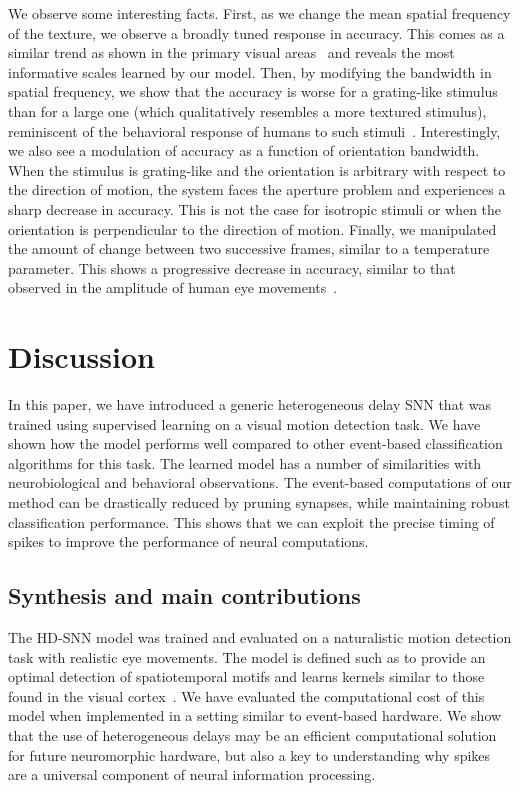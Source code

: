 \documentclass[default]{sn-jnl}%
\theoremstyle{thmstyleone}%
\theoremstyle{thmstyletwo}%
\theoremstyle{thmstylethree}%
\begin{document}
We observe some interesting facts. First, as we change the mean spatial frequency of the texture, we observe a broadly tuned response in accuracy. This comes as a similar trend as shown in the primary visual areas~\citep{priebe_tuning_2006,Perrinet2007} and reveals the most informative scales learned by our model. Then, by modifying the bandwidth in spatial frequency, we show that the accuracy is worse for a grating-like stimulus than for a large one (which qualitatively resembles a more textured stimulus), reminiscent of the behavioral response of humans to such stimuli~\citep{simoncini_more_2012, ravello_speed-selectivity_2019}. Interestingly, we also see a modulation of accuracy as a function of orientation bandwidth. When the stimulus is grating-like and the orientation is arbitrary with respect to the direction of motion, the system faces the aperture problem and experiences a sharp decrease in accuracy. This is not the case for isotropic stimuli or when the orientation is perpendicular to the direction of motion. Finally, we manipulated the amount of change between two successive frames, similar to a temperature parameter. This shows a progressive decrease in accuracy, similar to that observed in the amplitude of human eye movements~\citep{mansour_pour_speed_2018}.
%
\section{Discussion}
In this paper, we have introduced a generic heterogeneous delay SNN that was trained using supervised learning on a visual motion detection task. We have shown how the model performs well compared to other event-based classification algorithms for this task. The learned model has a number of similarities with neurobiological and behavioral observations. The event-based computations of our method can be drastically reduced by pruning synapses, while maintaining robust classification performance. This shows that we can exploit the precise timing of spikes to improve the performance of neural computations.
%
\subsection{Synthesis and main contributions}
The HD-SNN model was trained and evaluated on a naturalistic motion detection task with realistic eye movements. The model is defined such as to provide an optimal detection of  spatiotemporal motifs and learns kernels similar to those found in the visual cortex~\cite{deangelis_functional_1999, kremkow_push-pull_2016}. We have evaluated the computational cost of this model when implemented in a setting similar to event-based hardware. We show that the use of heterogeneous delays may be an efficient computational solution for future neuromorphic hardware, but also a key to understanding why spikes are a universal component of neural information processing.
\end{document}
